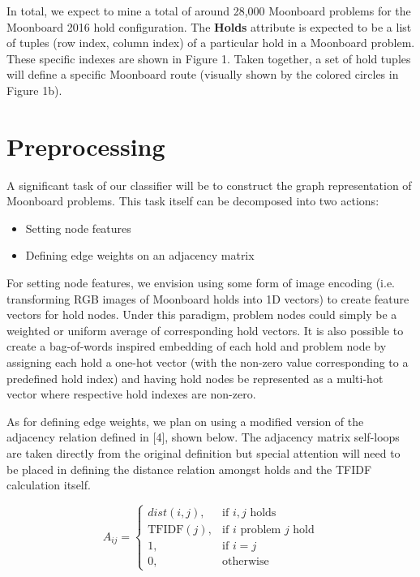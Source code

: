 \documentclass{article}
\begin{document}
In total, we expect to mine a total of around 28,000 Moonboard problems for the Moonboard 2016 hold configuration. The \textbf{Holds} attribute is expected to be a list of tuples (row index, column index) of a particular hold in a Moonboard problem. These specific indexes are shown in Figure 1. Taken together, a set of hold tuples will define a specific Moonboard route (visually shown by the colored circles in Figure 1b).

\section{Preprocessing}
A significant task of our classifier will be to construct the graph representation of Moonboard problems. This task itself can be decomposed into two actions: 

\begin{itemize}
\setlength\itemsep{0.1em}
\item Setting node features
\item Defining edge weights on an adjacency matrix
\end{itemize}

For setting node features, we envision using some form of image encoding (i.e. transforming RGB images of Moonboard holds into 1D vectors) to create feature vectors for hold nodes. Under this paradigm, problem nodes could simply be a weighted or uniform average of corresponding hold vectors. It is also possible to create a bag-of-words inspired embedding of each hold and problem node by assigning each hold a one-hot vector (with the non-zero value corresponding to a predefined hold index) and having hold nodes be represented as a multi-hot vector where respective hold indexes are non-zero. 

As for defining edge weights, we plan on using a modified version of the adjacency relation defined in [4], shown below. The adjacency matrix self-loops are taken directly from the original definition but special attention will need to be placed in defining the distance relation amongst holds and the TFIDF calculation itself.

\[
    A_{ij}= 
\begin{cases}
    dist(i, j), & \text{if } i, j \text{ holds} \\
    \text{TFIDF}(j), & \text{if } i \text{ problem } j \text{ hold} \\
    1, & \text{if } i=j \\
    0, & \text{otherwise}
\end{cases}
\]
\end{document}
